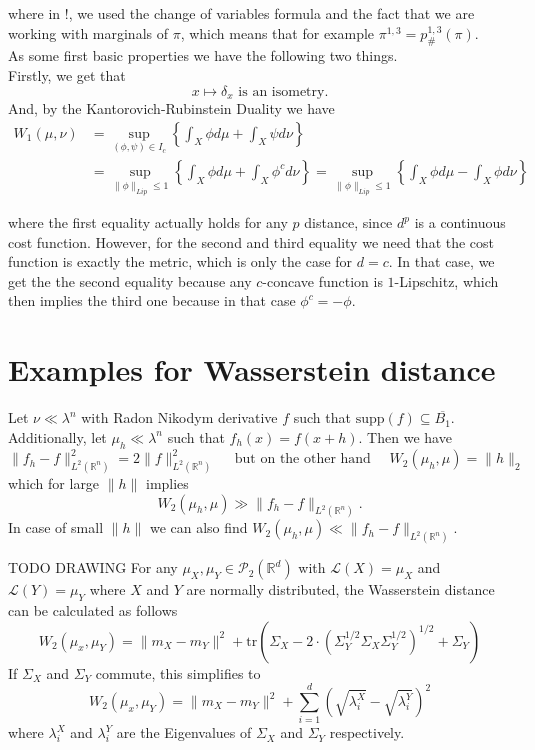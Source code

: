 \documentclass[15pt]{article}
\begin{document}
where in !, we used the change of variables formula and the fact that we are working with marginals of $\pi$, which means that for example $\pi^{1,3} = p^{1,3}_{\#}(\pi)$. \\

As some first basic properties we have the following two things. \\
Firstly, we get that $$x \mapsto \delta_x \text{ is an isometry.}$$ 
And, by the Kantorovich-Rubinstein Duality we have \begin{align*} W_1(\mu,\nu) &= \sup_{(\phi,\psi) \in I_c} \left\{ \int_X \phi d\mu + \int_X \psi d\nu \right\} \\ &= \sup_{\|\phi\|_{Lip} \leq 1} \left\{\int_X \phi d\mu + \int_X \phi^c d\nu  \right\} 
   = \sup_{\|\phi\|_{Lip} \leq 1} \left\{\int_X \phi d\mu - \int_X \phi d\nu  \right\} \end{align*}

where the first equality actually holds for any $p$ distance, since $d^p$ is a continuous cost function. However, for the second and third equality we need that the cost function is exactly the metric, which is only the case for $d = c$. In that case, we get the the second equality because any $c$-concave function is $1$-Lipschitz, which then implies the third one because in that case $\phi^c = -\phi$.

\section*{Examples for Wasserstein distance}
Let $\nu \ll \lambda^n$ with Radon Nikodym derivative $f$ such that $\text{supp}(f) \subseteq \overline{B_1}$. \\ 
Additionally, let $\mu_h \ll \lambda^n$ such that $f_h(x) = f(x+h)$. 
Then we have $$\|f_h-f\|^2_{L^2(\mathbb{R}^n)} = 2\|f\|_{L^2(\mathbb{R}^n)}^2 \quad \text{ but on the other hand } \quad W_2(\mu_h,\mu) = \|h\|_2$$ which for large $\|h\|$ implies $$W_2(\mu_h,\mu) \gg \|f_h-f\|_{L^2(\mathbb{R}^n)}.$$ 
In case of small $\|h\|$ we can also find $W_2(\mu_h,\mu) \ll \|f_h-f\|_{L^2(\mathbb{R}^n)}$.

\bigbreak
TODO DRAWING
\bigbreak
For any $\mu_X,\mu_Y \in \mathcal{P}_2(\mathbb{R}^d)$ with $\mathcal{L}(X) = \mu_X$ and $\mathcal{L}(Y) = \mu_Y$ where $X$ and $Y$ are normally distributed, 
    the Wasserstein distance can be calculated as follows $$W_2(\mu_x,\mu_Y) = \|m_X-m_Y\|^2 + \text{tr}\left(\Sigma_X-2 \cdot \left(\Sigma_Y^{1/2}\Sigma_X\Sigma_Y^{1/2}\right)^{1/2}+\Sigma_Y\right)$$
    If $\Sigma_X$ and $\Sigma_Y$ commute, this simplifies to $$W_2(\mu_x,\mu_Y) = \|m_X-m_Y\|^2 + \sum_{i = 1}^d \left( \sqrt{\lambda_i^X} - \sqrt{\lambda_i^Y}  \right)^2$$
    where $\lambda_i^X$ and $\lambda_i^Y$ are the Eigenvalues of $\Sigma_X$ and $\Sigma_Y$ respectively. 
\end{document}
